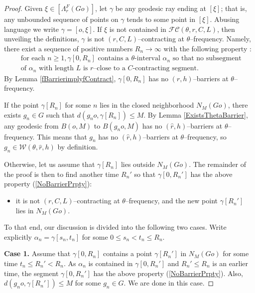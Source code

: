 \documentclass{amsart}
\theoremstyle{definition}
\theoremstyle{remark}
\begin{document}
\begin{proof}
Given $\xi\in [\Lambda_r^F(Go)]$, let  $\gamma$ be any geodesic ray ending at $[\xi]$; that is, any unbounded sequence of points on $\gamma$ tends to some point in $[\xi]$. Abusing language we write $\gamma=[o,\xi]$. If  $\xi$ is not contained  in $\mathcal{FC}(\theta, r, C,L)$, then unveiling the definitions,  $\gamma$    is not $( r, C, L)$–contracting at $\theta$--frequency. Namely, there exist a sequence of positive numbers $R_n\to\infty$ with the following property :  
\begin{equation}
\tag{$\circledast$}\begin{aligned}
    \label{NoBarrierPrpty}
    &\text{for each } n\ge 1, \gamma[0,R_n]\text{  contains a }\theta\text{-interval }\alpha_n \text{ so that no subsegment  }\\
    &\text{of }\alpha_n \text{  with length }L\text{  is } r\text{–close to a }C\text{-contracting segment.}   
    \end{aligned}
\end{equation}
By Lemma \ref{fBarrierimplyfContract}, $\gamma[0,R_n]$ has no $( r,h)$--barriers at $\theta$--frequency. 

If the point $\gamma[R_n]$ for some $n$ lies in the closed neighborhood $N_M(Go)$, there exists $g_n\in G$ such that $d(g_no, \gamma[R_n])\le M$. By Lemma \ref{ExistsThetaBarrier}, any geodesic from $B(o,M)$ to $B(g_no,M)$ has no $(\hat r, h)$--barriers at $\theta$--frequency. This means that $g_n$ has no $(\hat r, h)$--barriers at $\theta$--frequency, so $g_n\in \mathcal{W}(\theta,\hat r, h)$ by definition. 

Otherwise, let us assume that $\gamma[R_n]$ lies outside $N_M(Go)$. The remainder of the proof is then to find another time $R_n'$ so that $\gamma[0,R_n']$ has the above property (\ref{NoBarrierPrpty}): 
\begin{itemize}
    \item it is not $( r, C, L)$–contracting at $\theta$--frequency, and the new point $\gamma[R_n']$ lies in $N_M(Go)$. 
\end{itemize} To that end, our discussion is divided into the following two cases. Write explicitly $\alpha_n=\gamma[s_n,t_n]$ for some $0\le s_n<t_n\le R_n$.



\textbf{Case 1.} Assume that  $\gamma[0,R_n]$ contains a point $\gamma[R_n']$ in $ N_M(Go)$ for some time $t_n\le R_n'<R_n$. As $\alpha_n$ is contained in $\gamma[0,R_n']$ and $R_n'\le R_n$ is an earlier time,  the segment $\gamma[0,R_n']$     has the above  property (\ref{NoBarrierPrpty}). Also,    $d(g_no, \gamma[R_n'])\le M$ for some $g_n\in G$. We are done in this case.


\end{proof}
\end{document}
